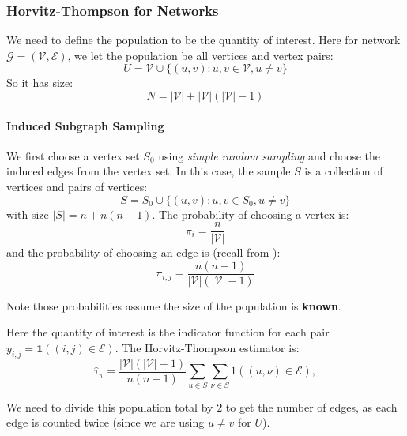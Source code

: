 \documentclass{article}
\begin{document}
\subsubsection{Horvitz-Thompson for Networks}

We need to define the population to be the quantity of interest. Here for network ${\mathcal{G}}=(\mathcal{V},{\mathcal{E}})$, we let the population be all vertices and vertex pairs:
\begin{equation*}
    U=\mathcal{V}\cup \{(u,v):u,v\in \mathcal{V}, u\neq v\}
\end{equation*}
So it has size:
\begin{equation*}
    N=|\mathcal{V}|+|\mathcal{V}|(|\mathcal{V}|-1)
\end{equation*}

\paragraph{Induced Subgraph Sampling} We first choose a vertex set $S_0$ using \textit{simple random sampling} and choose the induced edges from the vertex set. In this case, the sample $S$ is a collection of vertices and pairs of vertices:
\begin{equation*}
    S = S_0 \cup \{(u,v): u,v\in S_0, u\neq v\}
\end{equation*}
with size $|S|=n+n(n-1)$. The probability of choosing a vertex is:
\begin{equation*}
    \pi_i = \frac{n}{|\mathcal{V}|}
\end{equation*}
and the probability of choosing an edge is (recall from ):
\begin{equation*}
    \pi_{i,j} = \frac{n(n-1)}{|\mathcal{V}|(|\mathcal{V}|-1)}
\end{equation*}

Note those probabilities assume the size of the population is \textbf{known}.  


\begin{example}
    Here the quantity of interest is the indicator function for each pair $y_{i,j}=\mathbf{1}((i,j)\in \mathcal{E})$. The Horvitz-Thompson estimator is:
    \begin{equation*}
        \hat{\tau}_{\pi}=\frac{|\mathcal{V}|(|\mathcal{V}|-1)}{n(n-1)}\sum_{u\in S}\sum_{\nu\in S}1((u,\nu)\in\mathcal{E}),
    \end{equation*}

    We need to divide this population total by $2$ to get the number of edges, as each edge is counted twice (since we are using $u\neq v$ for $U$).
\end{example}
\end{document}
